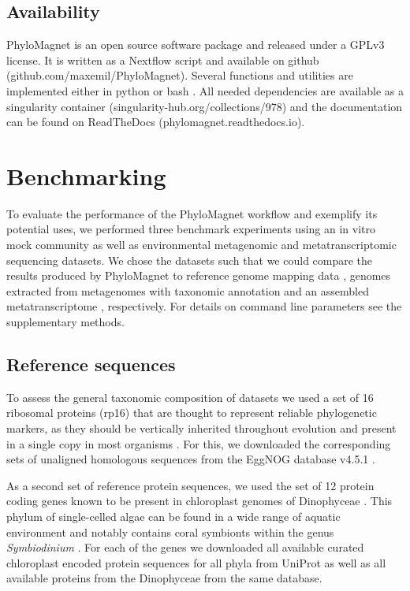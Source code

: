 \documentclass{bioinfo}
\begin{document}
\begin{methods}
\subsection{Availability}
PhyloMagnet is an open source software package and released under a GPLv3 license. It is written as a Nextflow \citep{DiTommaso2017} script and available on github (github.com/maxemil/PhyloMagnet). Several functions and utilities are implemented either in python or bash \citep{Dalke2009,Mckinney2010,Huerta-cepas2016a}. All needed dependencies are available as a singularity \citep{Kurtzer2017} container (singularity-hub.org/collections/978) and the documentation can be found on ReadTheDocs (phylomagnet.readthedocs.io).

\section{Benchmarking}
To evaluate the performance of the PhyloMagnet workflow and exemplify its potential uses, we performed three benchmark experiments using an in vitro mock community as well as environmental metagenomic and metatranscriptomic sequencing datasets. We chose the datasets such that we could compare the results produced by PhyloMagnet to reference genome mapping data \citep{Singer2016}, genomes extracted from metagenomes with taxonomic annotation \citep{Delmont2018} and an assembled metatranscriptome \citep{Frazier2017}, respectively. For details on command line parameters see the supplementary methods.

\subsection{Reference sequences}
To assess the general taxonomic composition of datasets we used a set of 16 ribosomal proteins (rp16) that are thought to represent reliable phylogenetic markers, as they should be vertically inherited throughout evolution and present in a single copy in most organisms \citep{Brown2015}. For this, we downloaded the corresponding sets of unaligned homologous sequences from the EggNOG database v4.5.1 \citep{Huerta-cepas2016b}.%

As a second set of reference protein sequences, we used the set of 12 protein coding genes known to be present in chloroplast genomes of Dinophyceae \citep{Howe2008}. This phylum of single-celled algae can be found in a wide range of aquatic environment and notably contains coral symbionts within the genus \textit{Symbiodinium} \citep{Gomez2012}. For each of the genes we downloaded all available curated chloroplast encoded protein sequences for all phyla from UniProt \citep{Apweiler2004} as well as all available proteins from the Dinophyceae from the same database.


\end{methods}
\end{document}

